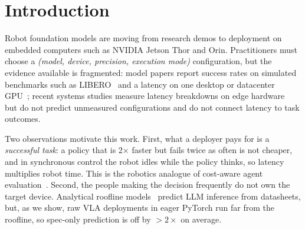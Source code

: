 \documentclass[10pt]{article}
\begin{document}
\section{Introduction}
Robot foundation models are moving from research demos to deployment on embedded computers such as
NVIDIA Jetson Thor and Orin. Practitioners must choose a \emph{(model, device, precision,
execution mode)} configuration, but the evidence available is fragmented: model papers report
success rates on simulated benchmarks such as LIBERO~\citep{liu2023libero} and a latency on one
desktop or datacenter GPU~\citep{kim2024openvla,kim2025oft,black2024pi0}; recent systems studies
measure latency breakdowns on edge hardware~\citep{xu2026hwbench,waseem2026where} but do not
predict unmeasured configurations and do not connect latency to task outcomes.

Two observations motivate this work. First, what a deployer pays for is a \emph{successful
task}: a policy that is 2$\times$ faster but fails twice as often is not cheaper, and in
synchronous control the robot idles while the policy thinks, so latency multiplies robot time.
This is the robotics analogue of cost-aware agent evaluation~\citep{kapoor2024agents}. Second,
the people making the decision frequently do not own the target device. Analytical roofline
models~\citep{williams2009roofline,yuan2024llmviewer,sun2026codesign} predict LLM inference
from datasheets, but, as we show, raw VLA deployments in eager PyTorch run far from the roofline,
so spec-only prediction is off by $>2\times$ on average.
\end{document}
